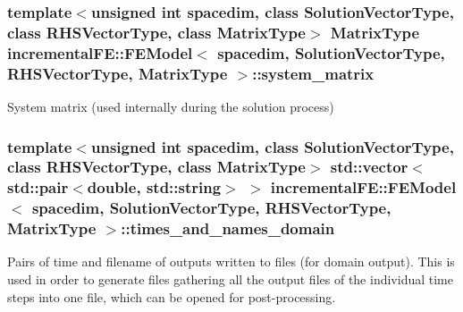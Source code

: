 \subsubsection[{\texorpdfstring{system\+\_\+matrix}{system_matrix}}]{\setlength{\rightskip}{0pt plus 5cm}template$<$unsigned int spacedim, class Solution\+Vector\+Type, class R\+H\+S\+Vector\+Type, class Matrix\+Type$>$ Matrix\+Type {\bf incremental\+F\+E\+::\+F\+E\+Model}$<$ spacedim, Solution\+Vector\+Type, R\+H\+S\+Vector\+Type, Matrix\+Type $>$\+::system\+\_\+matrix\hspace{0.3cm}{\ttfamily [private]}}\hypertarget{classincremental_f_e_1_1_f_e_model_abc07b7d142d78230bcd55274f35514b3}{}\label{classincremental_f_e_1_1_f_e_model_abc07b7d142d78230bcd55274f35514b3}
System matrix (used internally during the solution process) 
\subsubsection[{\texorpdfstring{times\+\_\+and\+\_\+names\+\_\+domain}{times_and_names_domain}}]{\setlength{\rightskip}{0pt plus 5cm}template$<$unsigned int spacedim, class Solution\+Vector\+Type, class R\+H\+S\+Vector\+Type, class Matrix\+Type$>$ std\+::vector$<$ std\+::pair$<$double, std\+::string$>$ $>$ {\bf incremental\+F\+E\+::\+F\+E\+Model}$<$ spacedim, Solution\+Vector\+Type, R\+H\+S\+Vector\+Type, Matrix\+Type $>$\+::times\+\_\+and\+\_\+names\+\_\+domain\hspace{0.3cm}{\ttfamily [private]}}\hypertarget{classincremental_f_e_1_1_f_e_model_a9a6cc0723bdeb129e330179ed4a87670}{}\label{classincremental_f_e_1_1_f_e_model_a9a6cc0723bdeb129e330179ed4a87670}
Pairs of time and filename of outputs written to files (for domain output). This is used in order to generate files gathering all the output files of the individual time steps into one file, which can be opened for post-\/processing. 
